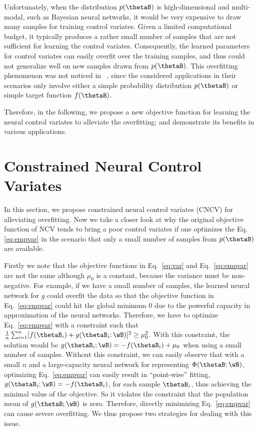 \documentclass[runningheads]{llncs}
\begin{document}
Unfortunately,  when the distribution $p(\thetaB)$ is high-dimensional and multi-modal, such as Bayesian neural networks, it would be very expensive to draw many samples for training control variates. Given a limited computational budget, it typically produces a rather small number of samples that are not sufficient for learning the control variates. Consequently, the learned parameters for control variates can easily overfit over the training samples, and thus could not generalize well on new samples drawn from $p(\thetaB)$. This overfitting phenomenon was not noticed  in ~\cite{liu2017action,tucker2017rebar}, since the considered applications in their scenarios only involve either a simple probability distribution $p(\thetaB)$ or simple target function $f(\thetaB)$. 

Therefore, in the following, we propose a new objective function for  learning the neural control variates to alleviate the overfitting; and demonstrate its benefits in various  applications.  



\section{Constrained Neural Control Variates}
In this section, we propose constrained neural control variates (CNCV) for alleviating overfitting. Now we take a closer look at why the original objective function of NCV tends to bring a poor control variates if one optimizes the Eq.\eqref{eq:empvar} in the scenario that only a small number of samples from $p(\thetaB)$ are available. 

Firstly we note that the objective functions in Eq.~\eqref{eq:var}  and  Eq.~\eqref{eq:empvar} are not the same although $\mu_0$ is a constant, because the variance must be non-negative. For example, if we have a small number of samples, the learned neural network for $g$ could overfit the data so that the objective function in Eq.~\eqref{eq:empvar} could hit the global minimum $0$ due to the powerful capacity in approximation of the neural networks. Therefore, we have to optimize Eq.~\eqref{eq:empvar} with a constraint such that $\frac{1}{n}\sum_{i=1}^n [f(\thetaB_i) + g(\thetaB_i; \wB)]^2\geq\mu_0^2$. With this constraint, the solution would be $g(\thetaB_i;\wB) = - f(\thetaB_i)+\mu_0$ when using a small number of samples.
Without this constraint, we can easily observe that with a small $n$  and a large-capacity neural network for representing $\Phi(\thetaB; \wB)$, optimizing  Eq.~\eqref{eq:empvar} can easily result in ``point-wise'' fitting, $g(\thetaB_i;\wB) = - f(\thetaB_i)$, for each sample $\thetaB_i$, thus achieving  the minimal value of the objective. So it violates the constraint that the population mean of $g(\thetaB;\wB)$ is zero.  Therefore, directly minimizing Eq.~\eqref{eq:empvar} can cause severe overfitting. We thus propose two strategies for dealing with this issue. 
\end{document}
